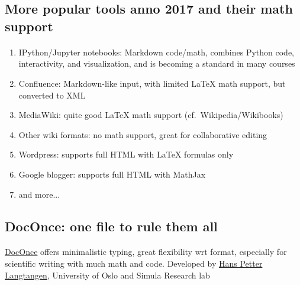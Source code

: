 \documentclass[%
oneside,                 %
final,                   %
10pt]{article}
\begin{document}
\noindent




\subsection{More popular tools anno 2017 and their math support}

\paragraph{}
\begin{enumerate}
\item IPython/Jupyter notebooks: Markdown code/math, combines Python code, interactivity, and visualization, and is becoming a standard in many courses

\item Confluence: Markdown-like input, with limited {\LaTeX} math support, but converted to XML

\item MediaWiki: quite good {\LaTeX} math support (cf.~Wikipedia/Wikibooks)

\item Other wiki formats: no math support, great for collaborative editing

\item Wordpress: supports full HTML with {\LaTeX} formulas only

\item Google blogger: supports full HTML with MathJax

\item and more...
\end{enumerate}

\noindent






\subsection{DocOnce: one file to rule them all}

\paragraph{}

\href{{http://hplgit.github.io/doconce/doc/web/index.html}}{DocOnce} offers minimalistic typing, great flexibility wrt format, especially for scientific writing with much math and code. Developed by \href{{http://hplgit.github.io/homepage/index.html}}{Hans Petter Langtangen}, University of Oslo and Simula Research lab
\end{document}
